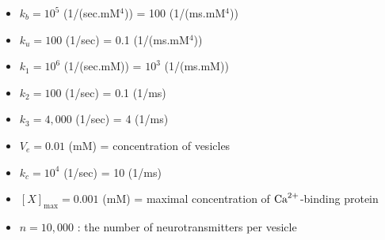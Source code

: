 \begin{itemize}
  \item $k_b = 10^5$ (1/(sec.mM$^4$)) = 100 (1/(ms.mM$^4$))
  
  \item $k_u = 100$ (1/sec) = 0.1 (1/(ms.mM$^4$))
  
  \item $k_1 = 10^6$ (1/(sec.mM)) = $10^3$ (1/(ms.mM))
  
  \item $k_2 = 100$ (1/sec) = 0.1 (1/ms)
  
  \item $k_3 = 4,000$ (1/sec) = 4 (1/ms)
  
  \item $V_e = 0.01$ (mM) = concentration of vesicles
  
  \item $k_c = 10^4$ (1/sec) = 10 (1/ms) 
  
  \item $[X]_\max = 0.001$ (mM) = maximal concentration of ${\text{Ca}^{2+}}$-binding protein
  
  \item $n=10,000$ : the number of neurotransmitters per vesicle
\end{itemize}